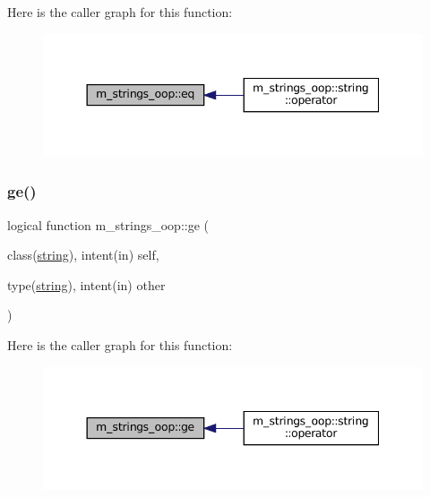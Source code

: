 Here is the caller graph for this function\+:\nopagebreak
\begin{figure}[H]
\begin{center}
\leavevmode
\includegraphics[width=344pt]{namespacem__strings__oop_a2e5c8d9117609e553db07a1eba18b1fa_icgraph}
\end{center}
\end{figure}
\mbox{\label{namespacem__strings__oop_a2d31ec44898046ba97aebc0de32de19a}} 
\subsubsection{\texorpdfstring{ge()}{ge()}}
{\footnotesize\ttfamily logical function m\+\_\+strings\+\_\+oop\+::ge (\begin{DoxyParamCaption}\item[{class(\mbox{\hyperlink{structm__strings__oop_1_1string}{string}}), intent(in)}]{self,  }\item[{type(\mbox{\hyperlink{structm__strings__oop_1_1string}{string}}), intent(in)}]{other }\end{DoxyParamCaption})\hspace{0.3cm}{\ttfamily [private]}}

Here is the caller graph for this function\+:\nopagebreak
\begin{figure}[H]
\begin{center}
\leavevmode
\includegraphics[width=344pt]{namespacem__strings__oop_a2d31ec44898046ba97aebc0de32de19a_icgraph}
\end{center}
\end{figure}
\mbox{\label{namespacem__strings__oop_a25beb184587d7c9fc0a3fd846d4ce187}} 

